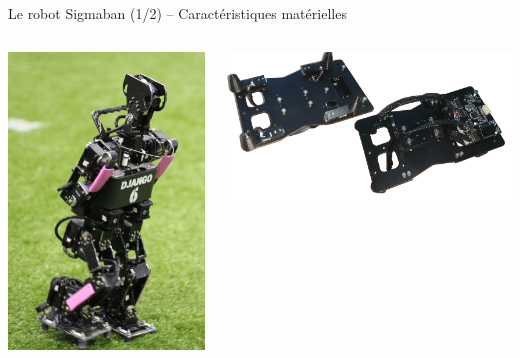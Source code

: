 \begin{frame}{Le robot Sigmaban (1/2) -- Caractéristiques matérielles}
\begin{columns}
\begin{column}{0.6\linewidth}
\begin{columns}
\begin{column}{0.4\linewidth}
                    \includegraphics[width=1.0\linewidth]{../media/sigmaban_1_6.png}
                \end{column}
                \begin{column}{0.6\linewidth}
                    \includegraphics[width=1.1\linewidth]{../media/pressures2.png}

\end{column}
\end{columns}
\end{column}
\end{columns}
\end{frame}
